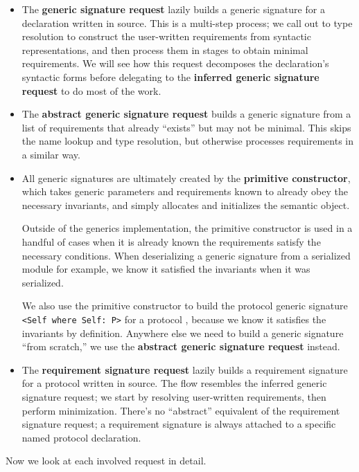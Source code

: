 \documentclass[../generics]{subfiles}
\begin{document}
\begin{itemize}
\item The \textbf{generic signature request} lazily builds a generic signature for a declaration written in source. This is a multi-step process; we call out to type resolution to construct the user-written requirements from syntactic representations, and then process them in stages to obtain minimal requirements. We will see how this request decomposes the declaration's syntactic forms before delegating to the \textbf{inferred generic signature request} to do most of the work.
\item The \textbf{abstract generic signature request} builds a generic signature from a list of requirements that already ``exists'' but may not be minimal. This skips the name lookup and type resolution, but otherwise processes requirements in a similar way.
\item All generic signatures are ultimately created by the \textbf{primitive constructor}, which takes generic parameters and requirements known to already obey the necessary invariants, and simply allocates and initializes the semantic object.

Outside of the generics implementation, the primitive constructor is used in a handful of cases when it is already known the requirements satisfy the necessary conditions. When deserializing a generic signature from a serialized module for example, we know it satisfied the invariants when it was serialized.

We also use the primitive constructor to build the protocol generic signature \verb|<Self where Self: P>| for a protocol \tP, because we know it satisfies the invariants by definition. Anywhere else we need to build a generic signature ``from scratch,'' we use the \textbf{abstract generic signature request} instead.

\item The \textbf{requirement signature request} lazily builds a requirement signature for a protocol written in source. The flow resembles the inferred generic signature request; we start by resolving user-written requirements, then perform minimization. There's no ``abstract'' equivalent of the requirement signature request; a requirement signature is always attached to a specific named protocol declaration.
\end{itemize}
Now we look at each involved request in detail.
\end{document}
